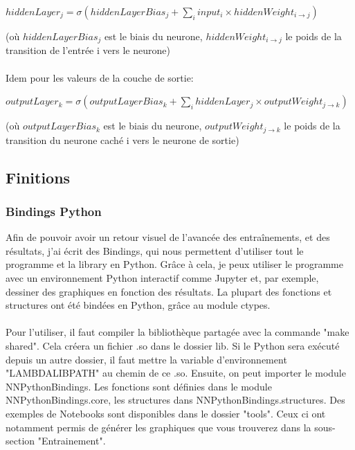 \documentclass{article}
\begin{document}
$hiddenLayer_j=\sigma(hiddenLayerBias_j+\sum_i input_i\times hiddenWeight_{i\rightarrow j})$

(où $hiddenLayerBias_j$ est le biais du neurone, $hiddenWeight_{i\rightarrow j}$ le poids de la transition de l’entrée i vers le neurone)

\vspace*{0.3cm}

\paragraph{} Idem pour les valeurs de la couche de sortie:\newline

$outputLayer_k=\sigma(outputLayerBias_k+\sum_i hiddenLayer_j\times outputWeight_{j\rightarrow k})$


(où $outputLayerBias_k$ est le biais du neurone, $outputWeight_{j\rightarrow k}$ le poids de la transition du neurone caché i vers le neurone de sortie)

\subsection{Finitions}

\subsubsection{Bindings Python}
Afin de pouvoir avoir un retour visuel de l’avancée des entraînements, et des résultats, j’ai écrit des Bindings, qui nous permettent d’utiliser tout le programme et la library en Python. Grâce à cela, je peux utiliser le programme avec un environnement Python interactif comme Jupyter et, par exemple, dessiner des graphiques en fonction des résultats.
La plupart des fonctions et structures ont été bindées en Python, grâce au module ctypes.
\paragraph{}Pour l’utiliser, il faut compiler la bibliothèque partagée avec la commande "make shared".
Cela créera un fichier .so dans le dossier lib.
Si le Python sera exécuté depuis un autre dossier, il faut mettre la variable d’environnement "LAMBDALIBPATH" au chemin de ce .so.
Ensuite, on peut importer le module NNPythonBindings.
Les fonctions sont définies dans le module NNPythonBindings.core, les structures dans NNPythonBindings.structures.
Des exemples de Notebooks sont disponibles dans le dossier "tools". Ceux ci ont notamment permis de générer les graphiques que vous trouverez dans la sous-section "Entrainement".
\end{document}
